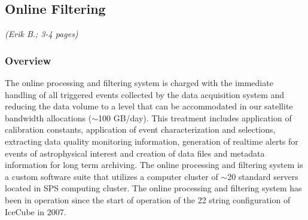 

\subsection{Online Filtering}
\textsl{(Erik B.; 3-4 pages)}
\subsubsection{Overview}

The online processing and filtering system is charged with the immediate handling of all triggered events collected by the data
acquisition system and reducing the data volume to a level that can be
accommodated in our satellite bandwidth allocations ($\sim$100 GB/day).
This treatment includes application of calibration constants, application of event characterization and selections,  
extracting data quality monitoring information, generation of realtime alerts for events of astrophysical interest
and creation of data files and metadata information for long term archiving.  The online processing and filtering system
is a custom software suite that utilizes a computer cluster of $\sim$20 standard servers located in SPS computing cluster.
The online processing and filtering system has been in operation since the
start of operation of the 22 string configuration of IceCube in 2007.

